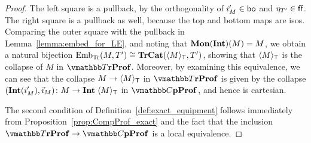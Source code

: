\documentclass[11pt,oneside,article]{memoir}
\begin{document}
\begin{proof}

   The left square is a pullback, by the orthogonality of $i'_M\in\mathsf{bo}$ and $\eta_{T'}\in\mathsf{ff}$. The
   right square is a pullback as well, because the top and bottom maps are isos. Comparing the outer
   square with the pullback in Lemma~\ref{lemma:embed_for_LE}, and noting that $\mathbf{Mon}(\mathbf{Int})(M)=M$, we
   obtain a natural bijection $\mathrm{Emb}_{\mathrm{Tr}}(M,T')\cong\mathbf{TrCat}(\langle M\rangle_{\mathsf{T}},T')$,
   showing that $\langle M\rangle_{\mathsf{T}}$ is the collapse of $M$ in $\dTrProf$. Moreover, by examining
   this equivalence, we can see that the collapse $M\to \langle M\rangle_{\mathsf{T}}$ in $\dTrProf$ is
   given by the collapse $(\mathbf{Int}(i'_M),\vec{\imath}_M)\colon M\to\mathbf{Int}\;\langle M\rangle_{\mathsf{T}}$ in
   $\dCompProf$, and hence is cartesian.

   The second condition of Definition~\ref{def:exact_equipment} follows immediately from
   Proposition~\ref{prop:CompProf_exact} and the fact that the inclusion $\dTrProf\to\dCompProf$ is
   a local equivalence.
\end{proof}
\end{document}
